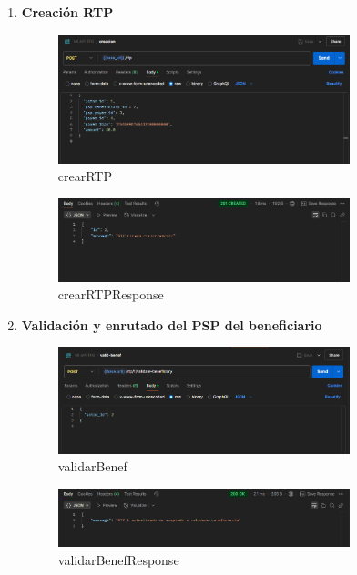 \begin{enumerate}
\item \textbf{Creación RTP}
    \begin{figure}[H]
    \centering
    \includegraphics[width=0.8\textwidth]{Imagenes/crearRTP.png}
    \caption{crearRTP}
    \label{fig:crearRTP}
    \end{figure}

    \begin{figure}[H]
    \centering
    \includegraphics[width=0.8\textwidth]{Imagenes/crearRTPResponse.png}
    \caption{crearRTPResponse}
    \label{fig:crearRTPResponse}
    \end{figure}
\item \textbf{Validación y enrutado del PSP del beneficiario}
    \begin{figure}[H]
    \centering
    \includegraphics[width=0.8\textwidth]{Imagenes/validarBenef.png}
    \caption{validarBenef}
    \label{fig:validarBenef}
    \end{figure}

    \begin{figure}[H]
    \centering
    \includegraphics[width=0.8\textwidth]{Imagenes/validarBenefResponse.png}
    \caption{validarBenefResponse}
    \label{fig:validarBenefResponse}
    \end{figure}


\end{enumerate}
